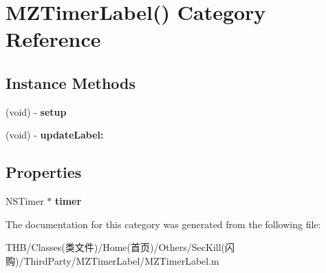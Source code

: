 \hypertarget{category_m_z_timer_label_07_08}{}\section{M\+Z\+Timer\+Label() Category Reference}
\label{category_m_z_timer_label_07_08}
\subsection*{Instance Methods}
\begin{DoxyCompactItemize}
\item 
\mbox{\label{category_m_z_timer_label_07_08_aa9218ab352d57cfa50259a1c917da914}} 
(void) -\/ {\bfseries setup}
\item 
\mbox{\label{category_m_z_timer_label_07_08_a30fad4c06ac68c78346554f24861acc1}} 
(void) -\/ {\bfseries update\+Label\+:}
\end{DoxyCompactItemize}
\subsection*{Properties}
\begin{DoxyCompactItemize}
\item 
\mbox{\label{category_m_z_timer_label_07_08_a22b35481533a27b7cbe2c88b76d3feb7}} 
N\+S\+Timer $\ast$ {\bfseries timer}
\end{DoxyCompactItemize}


The documentation for this category was generated from the following file\+:\begin{DoxyCompactItemize}
\item 
T\+H\+B/\+Classes(类文件)/\+Home(首页)/\+Others/\+Sec\+Kill(闪购)/\+Third\+Party/\+M\+Z\+Timer\+Label/M\+Z\+Timer\+Label.\+m\end{DoxyCompactItemize}
